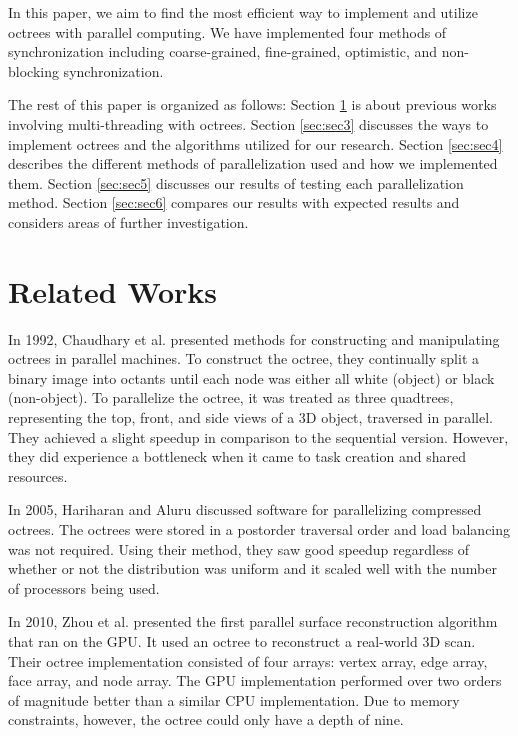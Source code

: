 \documentclass[conference]{IEEEtran}
\begin{document}
In this paper, we aim to find the most efficient way to implement and utilize octrees with parallel computing. We have implemented four methods of synchronization including coarse-grained, fine-grained, optimistic, and non-blocking synchronization. 

The rest of this paper is organized as follows: Section \ref{sec:sec2} is about previous works involving multi-threading with octrees. Section \ref{sec:sec3} discusses the ways to implement octrees and the algorithms utilized for our research. Section \ref{sec:sec4} describes the different methods of parallelization used and how we implemented them. Section \ref{sec:sec5} discusses our results of testing each parallelization method. Section \ref{sec:sec6} compares our results with expected results and considers areas of further investigation.


\section{Related Works} \label{sec:sec2}
In 1992, Chaudhary et al. \cite{ChaudharyEtAl} presented methods for constructing and manipulating octrees in parallel machines. To construct the octree, they continually split a binary image into octants until each node was either all white (object) or black (non-object). To parallelize the octree, it was treated as three quadtrees, representing the top, front, and side views of a 3D object,  traversed in parallel. They achieved a slight speedup in comparison to the sequential version. However, they did experience a bottleneck when it came to task creation and shared resources.

In 2005, Hariharan and Aluru \cite{HariharanAluru} discussed software for parallelizing compressed octrees. The octrees were stored in a postorder traversal order and load balancing was not required. Using their method, they saw good speedup regardless of whether or not the distribution was uniform and it scaled well with the number of processors being used. 

In 2010, Zhou et al. \cite{ZhouEtAl} presented the first parallel surface reconstruction algorithm that ran on the GPU. It used an octree to reconstruct a real-world 3D scan. Their octree implementation consisted of four arrays: vertex array, edge array, face array, and node array. The GPU implementation performed over two orders of magnitude better than a similar CPU implementation. Due to memory constraints, however, the octree could only have a depth of nine. 
\end{document}

